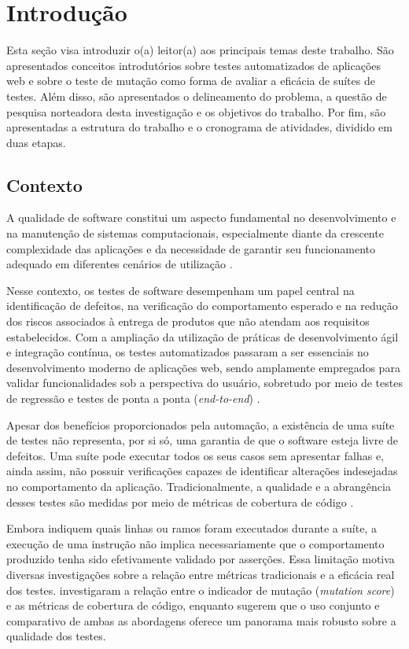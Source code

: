 \chapter{Introdução}

Esta seção visa introduzir o(a) leitor(a) aos principais temas deste trabalho. São apresentados conceitos introdutórios sobre testes automatizados de aplicações web e sobre o teste de mutação como forma de avaliar a eficácia de suítes de testes. Além disso, são apresentados o delineamento do problema, a questão de pesquisa norteadora desta investigação e os objetivos do trabalho. Por fim, são apresentadas a estrutura do trabalho e o cronograma de atividades, dividido em duas etapas.

\section{Contexto}

A qualidade de software constitui um aspecto fundamental no desenvolvimento e na manutenção de sistemas computacionais, especialmente diante da crescente complexidade das aplicações e da necessidade de garantir seu funcionamento adequado em diferentes cenários de utilização \cite{kochhar2015code}.

Nesse contexto, os testes de software desempenham um papel central na identificação de defeitos, na verificação do comportamento esperado e na redução dos riscos associados à entrega de produtos que não atendam aos requisitos estabelecidos. Com a ampliação da utilização de práticas de desenvolvimento ágil e integração contínua, os testes automatizados passaram a ser essenciais no desenvolvimento moderno de aplicações web, sendo amplamente empregados para validar funcionalidades sob a perspectiva do usuário, sobretudo por meio de testes de regressão e testes de ponta a ponta (\textit{end-to-end}) \cite{yandrapally2021}.

Apesar dos benefícios proporcionados pela automação, a existência de uma suíte de testes não representa, por si só, uma garantia de que o software esteja livre de defeitos. Uma suíte pode executar todos os seus casos sem apresentar falhas e, ainda assim, não possuir verificações capazes de identificar alterações indesejadas no comportamento da aplicação. Tradicionalmente, a qualidade e a abrangência desses testes são medidas por meio de métricas de cobertura de código \cite{zhang2022}.

Embora indiquem quais linhas ou ramos foram executados durante a suíte, a execução de uma instrução não implica necessariamente que o comportamento produzido tenha sido efetivamente validado por asserções. Essa limitação motiva diversas investigações sobre a relação entre métricas tradicionais e a eficácia real dos testes.  investigaram a relação entre o indicador de mutação (\textit{mutation score}) e as métricas de cobertura de código, enquanto   sugerem que o uso conjunto e comparativo de ambas as abordagens oferece um panorama mais robusto sobre a qualidade dos testes.

